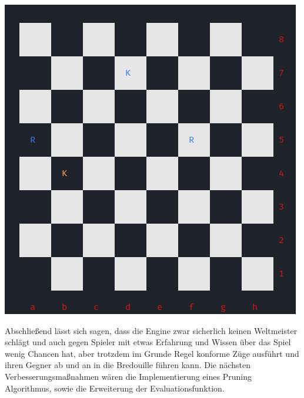 \documentclass[a4paper, 12pt]{article}
\begin{document}
\begin{center}
\includegraphics[scale=0.63]{images/st_1_2.png}
\label{ncurses_board}
\end{center}

Abschließend lässt sich sagen, dass die Engine zwar sicherlich keinen Weltmeister schlägt und auch gegen Spieler mit etwas Erfahrung und Wissen über das Spiel wenig Chancen hat, aber trotzdem im Grunde Regel konforme Züge ausführt und ihren Gegner ab und an in die Bredouille führen kann.
Die nächsten Verbesserungsmaßnahmen wären die Implementierung eines Pruning Algorithmus, sowie die Erweiterung der Evaluationsfunktion.

\clearpage

\newpage

\sloppy


\end{document}
